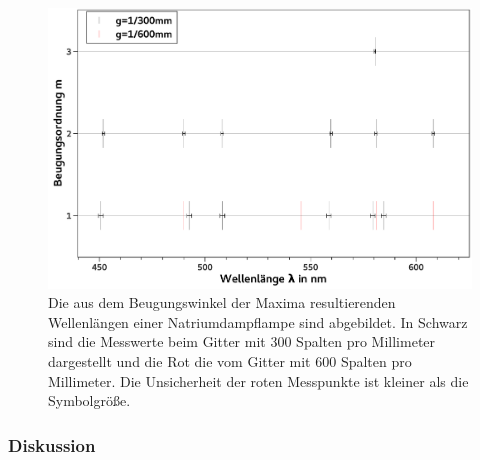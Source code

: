 \documentclass[
	a4paper,
	12pt,
	pagesize,
	ngerman
]{scrartcl}
\begin{document}
	\begin{figure}[H] 
		\includegraphics[width=1\textwidth]{fig_natrium}
		\centering
		\caption{Die aus dem Beugungswinkel der Maxima resultierenden Wellenlängen einer Natriumdampflampe sind abgebildet.
		In Schwarz sind die Messwerte beim Gitter mit 300 Spalten pro Millimeter dargestellt und die Rot die vom Gitter mit 600 Spalten pro Millimeter. 
		Die Unsicherheit der roten Messpunkte ist kleiner als die Symbolgröße.
		}
		\label{fig_natrium}
		\centering
	\end{figure}

	\subsubsection{Diskussion}
	
\end{document}
